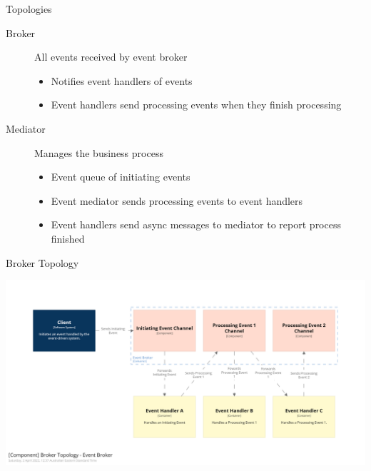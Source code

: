 \documentclass{slide}
\begin{document}
\begin{frame}{Topologies}
    \vspace{1mm}
    {\LARGE
    \begin{description}
        \item[Broker] All events received by event broker
        \begin{itemize}
            \Large\item Notifies event handlers of events
            \Large\item Event handlers send processing events when they finish processing
	\end{itemize}
        \vspace{3mm}
        \item[Mediator] Manages the business process
        \begin{itemize}
            \Large\item Event queue of initiating events
            \Large\item Event mediator sends processing events to event handlers
            \Large\item Event handlers send async messages to mediator to report process finished
	\end{itemize}
    \end{description}
    }
\end{frame}

\begin{frame}{Broker Topology}
    \begin{adjustwidth}{-10mm}{-10mm}
        \centering
        \includegraphics[trim=195 195 195 195,clip,width=0.97\paperwidth]{../../notes/event/diagrams/broker-components.png}
    \end{adjustwidth}
\end{frame}
\end{document}
